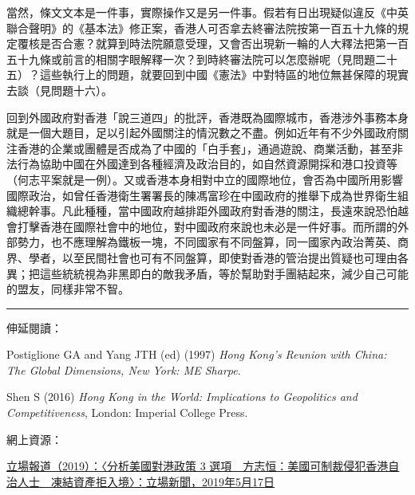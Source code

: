 當然，條文文本是一件事，實際操作又是另一件事。假若有日出現疑似違反《中英聯合聲明》的《基本法》修正案，香港人可否拿去終審法院按第一百五十九條的規定覆核是否合憲？就算到時法院願意受理，又會否出現新一輪的人大釋法把第一百五十九條或前言的相關字眼解釋一次？到時終審法院可以怎麼辦呢（見問題二十五）？這些執行上的問題，就要回到中國《憲法》中對特區的地位無甚保障的現實去談（見問題十六）。

回到外國政府對香港「說三道四」的批評，香港既為國際城市，香港涉外事務本身就是一個大題目，足以引起外國關注的情況數之不盡。例如近年有不少外國政府關注香港的企業或團體是否成為了中國的「白手套」，通過遊說、商業活動，甚至非法行為協助中國在外國達到各種經濟及政治目的，如自然資源開採和港口投資等（何志平案就是一例）。又或香港本身相對中立的國際地位，會否為中國所用影響國際政治，如曾任香港衛生署署長的陳馮富珍在中國政府的推舉下成為世界衛生組織總幹事。凡此種種，當中國政府越排距外國政府對香港的關注，長遠來說恐怕越會打擊香港在國際社會中的地位，對中國政府來說也未必是一件好事。而所謂的外部勢力，也不應理解為鐵板一塊，不同國家有不同盤算，同一國家內政治菁英、商界、學者，以至民間社會也可有不同盤算，即使對香港的管治提出質疑也可理由各異；把這些統統視為非黑即白的敵我矛盾，等於幫助對手團結起來，減少自己可能的盟友，同樣非常不智。

\rule[-10pt]{15cm}{0.05em}

伸延閱讀：

Postiglione GA and Yang JTH (ed) (1997) \textit{Hong Kong’s Reunion with China: The Global Dimensions, New York: ME Sharpe}.

Shen S (2016) \textit{Hong Kong in the World: Implications to Geopolitics and Competitiveness}, London: Imperial College Press.

網上資源：

\href{https://thestandnews.com/politics/分析美國對港政策-3-選項-方志恒-美國可制裁侵犯香港自治人士-凍結資產拒入境/}{立場報道（2019）：〈分析美國對港政策 3 選項　方志恒：美國可制裁侵犯香港自治人士　凍結資產拒入境〉：立場新聞，2019年5月17日}